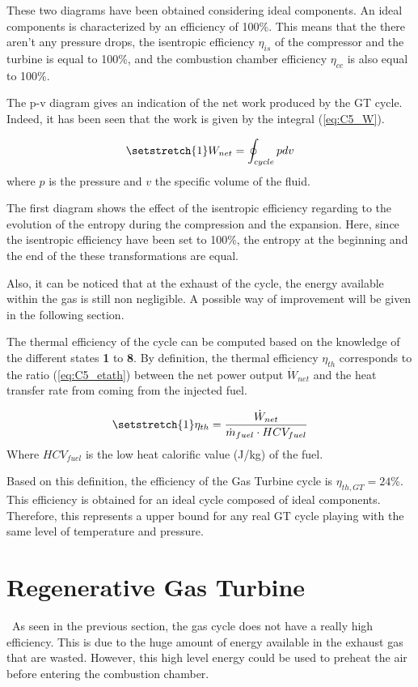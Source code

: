 These two diagrams have been obtained considering ideal components. An ideal components is characterized by an efficiency of 100\%. This means that the there aren't any pressure drops, the isentropic efficiency $\eta_{is}$ of the compressor and the turbine is equal to 100\%, and the combustion chamber efficiency $\eta_{cc}$ is also equal to 100\%.

The p-v diagram gives an indication of the net work produced by the GT cycle. Indeed, it has been seen that the work is given by the integral (\ref{eq:C5_W}).

\begin{equation}
    \setstretch{1}
    W_{net} = \oint_{cycle}pdv\label{eq:C5_W}
\end{equation}
where $p$ is the pressure and $v$ the specific volume of the fluid.

The first diagram shows the effect of the isentropic efficiency regarding to the evolution of the entropy during the compression and the expansion. Here, since the isentropic efficiency have been set to 100\%, the entropy at the beginning and the end of the these transformations are equal.

Also, it can be noticed that at the exhaust of the cycle, the energy available within the gas is still non negligible. A possible way of improvement will be given in the following section.

The thermal efficiency of the cycle can be computed based on the knowledge of the different states \textbf{1} to \textbf{8}. By definition, the thermal efficiency $\eta_{th}$ corresponds to the ratio (\ref{eq:C5_etath}) between the net power output $\dot{W}_{net}$ and the heat transfer rate from coming from the injected fuel.

\begin{equation}
    \setstretch{1}
    \eta_{th} = \frac{\dot{W}_{net}}{\dot{m}_{fuel}\cdot HCV_{fuel}} \label{eq:C5_etath}
\end{equation}
Where $HCV_{fuel}$ is the low heat calorific value (J/kg) of the fuel.

Based on this definition, the efficiency of the Gas Turbine cycle is $\eta_{th,GT} =24$\%. This efficiency is obtained for an ideal cycle composed of ideal components. Therefore, this represents a upper bound for any real GT cycle playing with the same level of temperature and pressure.

\section{Regenerative Gas Turbine}
\quad\, As seen in the previous section, the gas cycle does not have a really high efficiency. This is due to the huge amount of energy available in the exhaust gas that are wasted. However, this high level energy could be used to preheat the air before entering the combustion chamber. 

